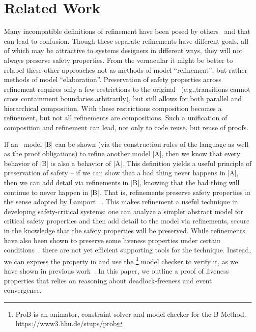 
\section{Related Work}
\label{sec:relatedWork}

Many incompatible definitions of refinement have been posed by
others~\cite{Syriani_2019,Maraninchi91theargos} and that can lead to confusion.
Though these separate refinements have different goals, all of which may be
attractive to systems designers in different ways,
they will not always preserve safety properties.  
From the \EventB vernacular it might be better to relabel these other approaches
not as methods of model ``refinement'', but rather methods of model
``elaboration''.  
Preservation of safety properties across refinement requires only a few
restrictions to the original~\cite{Harel} \SCs (e.g.,transitions cannot cross
containment boundaries arbitrarily), but still allows for both parallel and
hierarchical composition. 
With these restrictions composition becomes a refinement, but not all
refinements are compositions.  
Such a unification of composition and refinement can lead, not only to code
reuse, but reuse of proofs.

If an \EventB\ model |B| can be shown (via the construction rules of the \EventB
language as well as the proof obligations) to refine another \EventB
model |A|, then we know that every behavior of |B| is also a behavior
of |A|. This definition yields a useful principle of preservation of
safety -- if we can show that a bad thing never happens in |A|, then
we can add detail via refinements in |B|, knowing that the bad thing
will continue to never happen in |B|. That is, \EventB refinements
preserve safety properties in the sense adopted by Lamport
~\cite{lamport1977proving}. This makes refinement a useful technique
in developing safety-critical systems: one can analyze a simpler
abstract model for critical safety properties and then add detail to
the model via refinements, secure in the knowledge that the safety
properties will be preserved. While \EventB refinements have also been
shown to preserve some liveness properties under certain
conditions~\cite{hoang2016ltl}, there are not yet efficient supporting
tools for the technique. Instead, we can express the property in \LTL
and use the \PROB\footnote{ProB is an animator, constraint solver and
  model checker for the B-Method. https://www3.hhu.de/stups/prob}
model checker to verify it, as we have shown in previous
work~\cite{detect2020}.  In this paper, we outline a proof of liveness
properties that relies on reasoning about deadlock-freeness and event
convergence.



